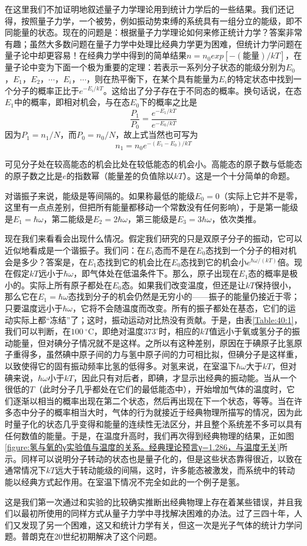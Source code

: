 在这里我们不加证明地叙述量子力学理论用到统计力学后的一些结果。我们还记得，按照量子力学，一个被势，例如振动势束缚的系统具有一组分立的能级，即不同能量的状态。现在的问题是：根据量子力学理论如何来修正统计力学？答案非常有趣；虽然大多数问题在量子力学中处理比经典力学更为困难，但统计力学问题在量子论中却更容易！在经典力学中得到的简单结果$n=n_0exp[-(\text{能量})/kT]$，在量子论中变为下面一个极为重要的定理：若表示一系列分子状态的能级分别为$E_0$，$E_1$，$E_2$，$\cdots$，$E_i$，$\cdots$，则在热平衡下，在某个具有能量为$E_i$的特定状态中找到一个分子的概率正比于$e^{-E_i/kT}$。这给出了分子存在于不同态的概率。换句话说，在态$E_1$中的概率，即相对机会，与在态$E_0$下的概率之比是
\begin{equation}
    \label{Eq:I:40:10}
    \frac{P_1}{P_0} = \frac{e^{-E_1/kT}}{e^{-E_0/kT}}
\end{equation}
因为$P_1=n_1/N$，而$P_0=n_0/N$，故上式当然也可写为
\begin{equation}
    \label{Eq:I:40:11}
    n_1 = n_0e^{-(E_1-E_0)/kT}
\end{equation}

可见分子处在较高能态的机会比处在较低能态的机会小。高能态的原子数与低能态的原子数之比是$e$的指数幂（能量差的负值除以$kT$）。这是一个十分简单的命题。

对谐振子来说，能级是等间隔的。如果称最低的能级$E_0=0$（实际上它并不是零，这里有一点点差别，但把所有能量都移动一个常数没有任何影响），于是第一能级是$E_1 = \hbar\omega$，第二能级是$E_2 = 2\hbar\omega$，第三能级是$E_3 = 3\hbar\omega$，依次类推。

现在我们来看看会出现什么情况。假定我们研究的只是双原子分子的振动，它可以近似地看成是一个谐振子。我们问：在$E_1$态而不是在$E_0$态找到一个分子的相对机会是多少？答案是，在$E_1$态找到它的机会比在$E_0$态找到它的机会小$e^{\hbar\omega/(kT)}$倍。现在假定$kT$远小于$\hbar\omega$，即气体处在低温条件下。那么，原子出现在$E_1$态的概率是极小的。实际上所有原子都处在$E_0$态。如果我们改变温度，但还是让$kT$保持很小，那么它在$E_1 = \hbar\omega$态找到分子的机会仍然是无穷小的——振子的能量仍接近于零；只要温度远小于$\hbar\omega$，它将不会随温度而改变。所有的振子都处在基态，它们的运动实际上都“冻结”了；这时，振动运动对比热没有贡献。于是，由表\ref{Table:40:1}，我们可以判断，在$100~^\circ$C，即绝对温度$373^\circ$时，相应的$kT$值远小于氧或氢分子的振动能量，但对碘分子情况就不是这样。之所以有这种差别，原因在于碘原子比氢原子重得多，虽然碘中原子间的力与氢中原子间的力可相比拟，但碘分子是这样重，以致使得它的固有振动频率比氢的低得多。对氢来说，在室温下$\hbar\omega$大于$kT$，但对碘来说，$\hbar\omega$小于$kT$，因此只有对后者，即碘，才显示出经典的振动能。当从一个很低的$T$（此时分子几乎都处在它们的最低能态中），开始增加气体的温度时，它们逐渐以相当的概率出现在第二个状态，然后再出现在下一个状态，等等。当在许多态中分子的概率相当大时，气体的行为就接近于经典物理所描写的情况，因为此时量子化的状态几乎变得和能量的连续性无法区分，并且整个系统差不多可以具有任何数值的能量。于是，在温度升高时，我们再次得到经典物理的结果，正如图\ref{figure:氢与氧的γ实验值与温度的关系。经典理论预言γ=1.286，与温度无关}所示。同样可以说明分子转动的状态也是量子化的，但是这些状态靠得很近，以致在通常情况下$kT$远大于转动能级的间隔，这时，许多能态被激发，而系统中的转动能以经典方式起作用。在室温下情况不完全如此的一个例子是氢。

这是我们第一次通过和实验的比较确实推断出经典物理上存在着某些错误，并且我们以最初所使用的同样方式从量子力学中寻找解决困难的办法。过了三四十年，人们又发现了另一个困难，这又和统计力学有关，但这一次是光子气体的统计力学问题。普朗克在20世纪初期解决了这个问题。